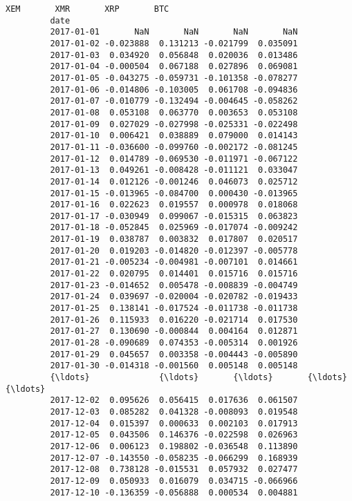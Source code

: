 \documentclass[11pt]{article}
\begin{document}
\begin{Verbatim}[commandchars=\\\{\}]
                          XEM       XMR       XRP       BTC  
         date                                                
         2017-01-01       NaN       NaN       NaN       NaN  
         2017-01-02 -0.023888  0.131213 -0.021799  0.035091  
         2017-01-03  0.034920  0.056848  0.020036  0.013486  
         2017-01-04 -0.000504  0.067188  0.027896  0.069081  
         2017-01-05 -0.043275 -0.059731 -0.101358 -0.078277  
         2017-01-06 -0.014806 -0.103005  0.061708 -0.094836  
         2017-01-07 -0.010779 -0.132494 -0.004645 -0.058262  
         2017-01-08  0.053108  0.063770  0.003653  0.053108  
         2017-01-09  0.027029 -0.027998 -0.025331 -0.022498  
         2017-01-10  0.006421  0.038889  0.079000  0.014143  
         2017-01-11 -0.036600 -0.099760 -0.002172 -0.081245  
         2017-01-12  0.014789 -0.069530 -0.011971 -0.067122  
         2017-01-13  0.049261 -0.008428 -0.011121  0.033047  
         2017-01-14  0.012126 -0.001246  0.046073  0.025712  
         2017-01-15 -0.013965 -0.084700  0.000430 -0.013965  
         2017-01-16  0.022623  0.019557  0.000978  0.018068  
         2017-01-17 -0.030949  0.099067 -0.015315  0.063823  
         2017-01-18 -0.052845  0.025969 -0.017074 -0.009242  
         2017-01-19  0.038787  0.003832  0.017807  0.020517  
         2017-01-20  0.019203 -0.014820 -0.012397 -0.005778  
         2017-01-21 -0.005234 -0.004981 -0.007101  0.014661  
         2017-01-22  0.020795  0.014401  0.015716  0.015716  
         2017-01-23 -0.014652  0.005478 -0.008839 -0.004749  
         2017-01-24  0.039697 -0.020004 -0.020782 -0.019433  
         2017-01-25  0.138141 -0.017524 -0.011738 -0.011738  
         2017-01-26  0.115933  0.016220 -0.021714  0.017530  
         2017-01-27  0.130690 -0.000844  0.004164  0.012871  
         2017-01-28 -0.090689  0.074353 -0.005314  0.001926  
         2017-01-29  0.045657  0.003358 -0.004443 -0.005890  
         2017-01-30 -0.014318 -0.001560  0.005148  0.005148  
         {\ldots}              {\ldots}       {\ldots}       {\ldots}       {\ldots}  
         2017-12-02  0.095626  0.056415  0.017636  0.061507  
         2017-12-03  0.085282  0.041328 -0.008093  0.019548  
         2017-12-04  0.015397  0.000633  0.002103  0.017913  
         2017-12-05  0.043506  0.146376 -0.022598  0.026963  
         2017-12-06  0.006123  0.198802 -0.036548  0.113890  
         2017-12-07 -0.143550 -0.058235 -0.066299  0.168939  
         2017-12-08  0.738128 -0.015531  0.057932  0.027477  
         2017-12-09  0.050933  0.016079  0.034715 -0.066966  
         2017-12-10 -0.136359 -0.056888  0.000534  0.004881  

\end{Verbatim}
\end{document}
